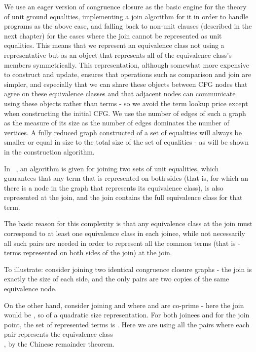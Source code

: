 We use an eager version of congruence closure as the basic engine for the theory of unit ground equalities, implementing a join algorithm for it in order to handle programs as the above case, and falling back to non-unit clauses (described in the next chapter) for the cases where the join cannot be represented as unit equalities. 
This means that we represent an equivalence class not using a representative but as an object that represents all of the equivalence class's members symmetrically. This representation, although somewhat more expensive to construct and update, ensures that operations such as comparison and join are simpler, and especially that we can share these objects between CFG nodes that agree on these equivalence classes and that adjacent nodes can communicate using these objects rather than terms - so we avoid the  term lookup price except when constructing the initial CFG.
We use the number of edges of such a graph as the measure of its size as the number of edges dominates the number of vertices. A fully reduced graph constructed of a set of equalities will always be smaller or equal in size to the total size of the set of equalities - as will be shown in the construction algorithm.

In ~\cite{GulwaniTiwariNecula04}, an  algorithm is given for joining two sets of unit equalities, which guarantees that any term that is represented on both sides (that is, for which an there is a node in the graph that represents its equivalence class), is also represented at the join, and the join contains the full equivalence class for that term.

The basic reason for this complexity is that any equivalence class at the join must correspond to at least one equivalence class in each joinee, while not necessarily all such pairs are needed in order to represent all the common terms (that is - terms represented on both sides of the join) at the join.

To illustrate: consider joining two identical congruence closure graphs - the join is exactly the size of each side, and the only pairs are two copies of the same equivalence node.

On the other hand, consider joining   and  where  and  are co-prime - here the join would be 
, so of a quadratic size representation. 
For both joinees and for the join point, the set of represented terms is .
Here we are using all the pairs where each pair  represents the equivalence class \\
, by the Chinese remainder theorem.

